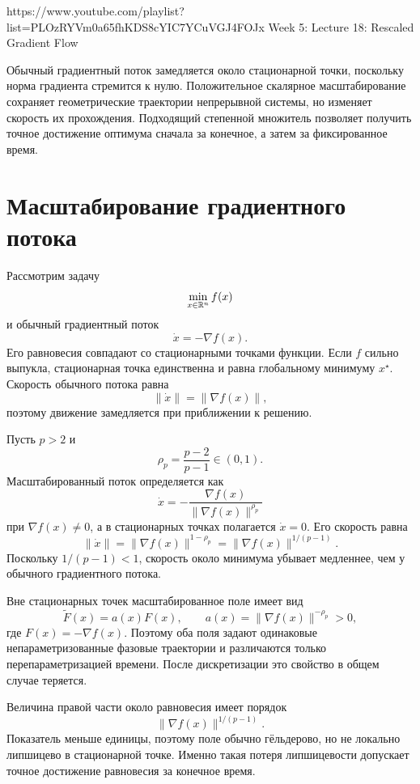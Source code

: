 
\sourcevideo
    {https://www.youtube.com/playlist?list=PLOzRYVm0a65fhKDS8cYIC7YCuVGJ4FOJx}
    {Week 5: Lecture 18: Rescaled Gradient Flow}

Обычный градиентный поток замедляется около стационарной точки,
поскольку норма градиента стремится к нулю. Положительное скалярное
масштабирование сохраняет геометрические траектории непрерывной
системы, но изменяет скорость их прохождения. Подходящий степенной
множитель позволяет получить точное достижение оптимума сначала за
конечное, а затем за фиксированное время.

\section{Масштабирование градиентного потока}

Рассмотрим задачу
\[
    \min_{x\in\mathbb{R}^n}f(x)
\]
и обычный градиентный поток
\[
    \dot x=-\nabla f(x).
\]
Его равновесия совпадают со стационарными точками функции. Если
\(f\) сильно выпукла, стационарная точка единственна и равна
глобальному минимуму \(x^\star\). Скорость обычного потока равна
\[
    \lVert\dot x\rVert=\lVert\nabla f(x)\rVert,
\]
поэтому движение замедляется при приближении к решению.

Пусть \(p>2\) и
\[
    \rho_p=\frac{p-2}{p-1}\in(0,1).
\]
Масштабированный поток определяется как
\[
    \dot x
    =
    -\frac{\nabla f(x)}
    {\lVert\nabla f(x)\rVert^{\rho_p}}
\]
при \(\nabla f(x)\ne0\), а в стационарных точках полагается
\(\dot x=0\). Его скорость равна
\[
    \lVert\dot x\rVert
    =
    \lVert\nabla f(x)\rVert^{1-\rho_p}
    =
    \lVert\nabla f(x)\rVert^{1/(p-1)}.
\]
Поскольку \(1/(p-1)<1\), скорость около минимума убывает медленнее,
чем у обычного градиентного потока.

Вне стационарных точек масштабированное поле имеет вид
\[
    \widetilde F(x)=a(x)F(x),
    \qquad
    a(x)=\lVert\nabla f(x)\rVert^{-\rho_p}>0,
\]
где \(F(x)=-\nabla f(x)\). Поэтому оба поля задают одинаковые
непараметризованные фазовые траектории и различаются только
перепараметризацией времени. После дискретизации это свойство в общем
случае теряется.

Величина правой части около равновесия имеет порядок
\[
    \lVert\nabla f(x)\rVert^{1/(p-1)}.
\]
Показатель меньше единицы, поэтому поле обычно гёльдерово, но не
локально липшицево в стационарной точке. Именно такая потеря
липшицевости допускает точное достижение равновесия за конечное время.

